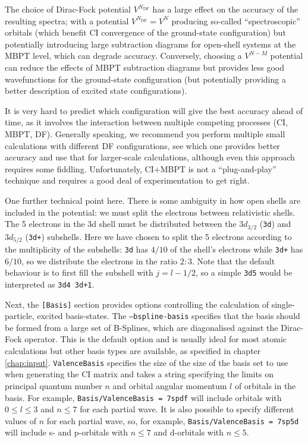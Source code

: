 \documentclass{report}
\begin{document}
The choice of Dirac-Fock potential $V^{N_{\mathrm{DF}}}$ has a large effect on the accuracy of the 
resulting spectra; with a potential $V^{N_{\mathrm{DF}}} = V^{N}$ producing so-called ``spectroscopic'' 
orbitals (which benefit CI convergence of the ground-state configuration) but potentially introducing 
large subtraction diagrams for open-shell systems at the MBPT level, which can degrade accuracy. 
Conversely, choosing a $V^{N-M}$ potential can reduce the effects of MBPT subtraction diagrams but
provides less good wavefunctions for the ground-state configuration (but potentially providing a better
description of excited state configurations). 

It is very hard to predict which configuration will give the best accuracy ahead of time, as it involves
the interaction between multiple competing processes (CI, MBPT, DF). Generally speaking, we recommend 
you perform multiple small calculations with different DF configurations, see which one provides better 
accuracy and use that for larger-scale calculations, although even this approach requires some fiddling.
Unfortunately, CI+MBPT is not a ``plug-and-play'' technique and requires a good deal of experimentation
to get right.

One further technical point here. There is some ambiguity in how open shells are included in the potential: we must split the electrons between relativistic shells. The 5 electrons in the 3d shell must be distributed between the $3d_{3/2}$ (\texttt{3d}) and $3d_{5/2}$ (\texttt{3d+}) subshells. Here we have chosen to split the 5 electrons according to the multiplicity of the subshells: \texttt{3d} has $4/10$ of the shell's electrons while \texttt{3d+} has $6/10$, so we distribute the electrons in the ratio $2:3$. Note that the default behaviour is to first fill the subshell with $j = l-1/2$, so a simple \texttt{3d5} would be interpreted as \texttt{3d4 3d+1}.

Next, the \texttt{[Basis]} section provides options controlling the calculation of single-particle, 
excited basis-states. The \texttt{--bspline-basis} specifies that the basis should be formed from a 
large set of B-Splines, which are diagonalised against the Dirac-Fock operator. This is the default
option and is usually ideal for most atomic calculations but other basis types are available, as
specified in chapter \ref{chap:input}. \texttt{ValenceBasis} specifies the size of the size of the basis
set to use when generating the CI matrix and takes a string specifying the limits on principal quantum
number $n$ and orbital angular momentum $l$ of orbitals in the basis. For example, 
\texttt{Basis/ValenceBasis = 7spdf} will include orbitals with $0 \leq l \leq 3$ and $n \leq 7$ for
each partial wave. It is also possible to specify different values of $n$ for each partial wave, so, for
example, \texttt{Basis/ValenceBasis = 7sp5d} will include s- and p-orbitals with $n \leq 7$ and
d-orbitals with $n \leq 5$.
\end{document}
